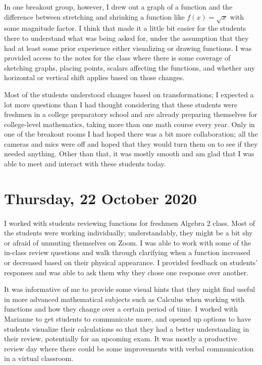 \documentclass{article}
\begin{document}
In one breakout group, however, I drew out a graph of a function and the difference between stretching and shrinking a function like $f(x) = \sqrt{x}$ with some magnitude factor. I think that made it a little bit easier for the students there to understand what was being asked for, under the assumption that they had at least some prior experience either visualizing or drawing functions. I was provided access to the notes for the class where there is some coverage of sketching graphs, placing points, scalars affecting the functions, and whether any horizontal or vertical shift applies based on those changes. 

Most of the students understood changes based on transformations; I expected a lot more questions than I had thought considering that these students were freshmen in a college preparatory school and are already preparing themselves for college-level mathematics, taking more than one math course every year. Only in one of the breakout rooms I had hoped there was a bit more collaboration; all the cameras and mics were off and hoped that they would turn them on to see if they needed anything. Other than that, it was mostly smooth and am glad that I was able to meet and interact with these students today. 

\section{Thursday, 22 October 2020}

\paragraph{}I worked with students reviewing functions for freshmen Algebra 2 class. Most of the students were working individually; understandably, they might be a bit shy or afraid of unmuting themselves on Zoom. I was able to work with some of the in-class review questions and walk through clarifying when a function increased or decreased based on their physical appearance. I provided feedback on students' responses and was able to ask them why they chose one response over another. 

It was informative of me to provide some visual hints that they might find useful in more advanced mathematical subjects such as Calculus when working with functions and how they change over a certain period of time. I worked with Marianne to get students to communicate more, and opened up options to have students visualize their calculations so that they had a better understanding in their review, potentially for an upcoming exam. It was mostly a productive review day where there could be some improvements with verbal communication in a virtual classroom. 
\end{document}
